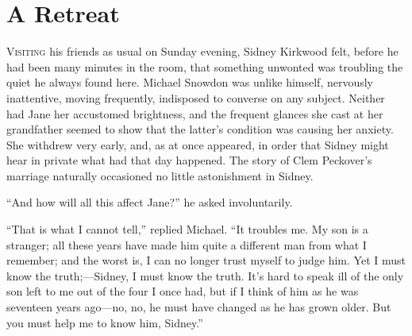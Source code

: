 \chapter{A Retreat}

\textsc{Visiting} his friends as usual on Sunday evening, Sidney
Kirkwood felt, before he had been many minutes in the room, that
something unwonted was troubling the quiet he always found here. Michael
Snowdon was unlike himself, nervously inattentive, moving frequently,
indisposed to converse on any subject. Neither had Jane her accustomed
brightness, and the frequent glances she cast at her grandfather seemed
to show that the latter's condition was causing her anxiety. She
withdrew very early, and, as at once appeared, in order that Sidney
might hear in private what had that day happened. The story of Clem
Peckover's marriage naturally occasioned no little astonishment in
Sidney.

{\protect\hypertarget{99}{}{}}``And how will all this affect Jane?'' he
asked involuntarily.

``That is what I cannot tell,'' replied Michael. ``It troubles me. My
son is a stranger; all these years have made him quite a different man
from what I remember; and the worst is, I can no longer trust myself to
judge him. Yet I must know the truth;---Sidney, I must know the truth.
It's hard to speak ill of the only son left to me out of the four I once
had, but if I think of him as he was seventeen years ago---no, no, he
must have changed as he has grown older. But you must help me to know
him, Sidney.''

